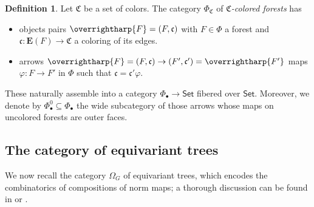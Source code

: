 \documentclass[a4paper,10pt
,draft
]{article}%
\numberwithin{equation}{section}
\numberwithin{figure}{section}
\theoremstyle{definition} %
\newtheorem{definition}[equation]{Definition}%
\newcommand{\vect}[1]{\text{\overrightharp{\ensuremath{#1}}}}
\newcommand{\Set}{\ensuremath{\mathsf{Set}}}
\newcommand{\1}{\ensuremath{\mathbbm 1}}%
\begin{document}
\begin{definition}
      \label{CFOREST_DEF}
      Let $\mathfrak C$ be a set of colors.
      The category $\Phi_{\mathfrak C}$ of \textit{$\mathfrak C$-colored forests} has
      \begin{itemize}
      \item objects pairs $\vect F = (F, \mathfrak c)$ with
            $F \in \Phi$ a forest and
            $\mathfrak c \colon \boldsymbol{E}(F) \to \mathfrak C$ a coloring of its edges.
      \item arrows $\vect F = (F, \mathfrak c) \to (F', \mathfrak c') = \vect{F'}$ maps
            $\varphi \colon F \to F'$ in $\Phi$ such that $\mathfrak c = \mathfrak c' \varphi$.
      \end{itemize}      

      These naturally assemble into a category $\Phi_\bullet \to \Set$ fibered over $\Set$.
      Moreover, we denote by
      $\Phi_\bullet^0 \subseteq \Phi_\bullet$
      the wide subcategory of those arrows whose maps on uncolored forests are outer faces.
\end{definition}




\subsection{The category of equivariant trees}

We now recall the category $\Omega_G$ of equivariant trees, which encodes the combinatorics of compositions of norm maps;
a thorough discussion can be found in \cite{Per18} or \cite[\S 2]{BP_edss}.
\end{document}
